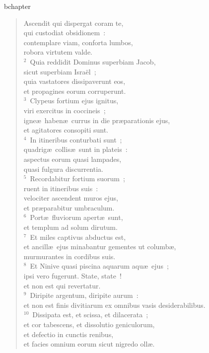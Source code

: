 bchapter\begin{flushleft}\begin{verse}\vspace{-19pt}Ascendit qui dispergat coram te,\\ qui custodiat obsidionem~:\\ contemplare viam, conforta lumbos,\\ robora virtutem valde.\\
${}^{2}$~Quia reddidit Dominus superbiam Jacob,\\ sicut superbiam Isra\"el~;\\ quia vastatores dissipaverunt eos,\\ et propagines eorum corruperunt.\\
${}^{3}$~Clypeus fortium ejus ignitus,\\ viri exercitus in coccineis~;\\ igne\ae\ haben\ae\ currus in die pr\ae parationis ejus,\\ et agitatores consopiti sunt.\\
${}^{4}$~In itineribus conturbati sunt~;\\ quadrig\ae\ collis\ae\ sunt in plateis~:\\ aspectus eorum quasi lampades,\\ quasi fulgura discurrentia.\\
${}^{5}$~Recordabitur fortium suorum~;\\ ruent in itineribus suis~:\\ velociter ascendent muros ejus,\\ et pr\ae parabitur umbraculum.\\
${}^{6}$~Port\ae\ fluviorum apert\ae\ sunt,\\ et templum ad solum dirutum.\\
${}^{7}$~Et miles captivus abductus est,\\ et ancill\ae\ ejus minabantur gementes ut columb\ae ,\\ murmurantes in cordibus suis.\\
${}^{8}$~Et Ninive quasi piscina aquarum aqu\ae\ ejus~;\\ ipsi vero fugerunt. State, state~!\\ et non est qui revertatur.\\
${}^{9}$~Diripite argentum, diripite aurum~:\\ et non est finis divitiarum ex omnibus vasis desiderabilibus.\\
${}^{10}$~Dissipata est, et scissa, et dilacerata~;\\ et cor tabescens, et dissolutio geniculorum,\\ et defectio in cunctis renibus,\\ et facies omnium eorum sicut nigredo oll\ae .\\

\end{verse}
\end{flushleft}
